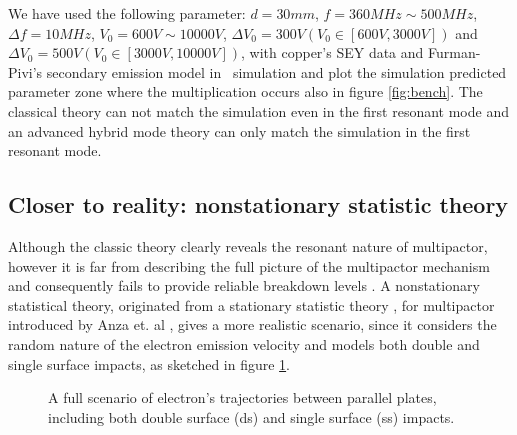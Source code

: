 \documentclass[a4paper,11pt]{article}
\begin{document}
We have used the following parameter: $d=30mm$, $f=360MHz \sim 500MHz$, $\Delta f=10MHz$, $V_0=600V \sim 10000V$, $\Delta V_0=300V (V_0 \in [600V,3000V])$ and $\Delta V_0=500V (V_0 \in [3000V,10000V])$, with copper's SEY data and Furman-Pivi's secondary emission model in \opal\ simulation and plot the simulation predicted parameter zone where the multiplication occurs also in figure \ref{fig:bench}. The classical theory can not match the simulation even in the first resonant mode and an advanced hybrid mode theory \cite{PP} can only match the simulation in the first resonant mode.
\subsection{Closer to reality: nonstationary statistic theory} 
Although the classic theory clearly reveals the resonant nature of multipactor, however it is far from describing the full picture of the multipactor mechanism and consequently fails to provide reliable breakdown levels \cite{NS}. A nonstationary statistical theory, originated from a stationary statistic theory \cite{ST}, for multipactor introduced by Anza et. al \cite{NS}, gives a more realistic scenario, since it considers the random nature of the electron emission velocity and models both double and single surface impacts, as sketched in figure \ref{fig:ss-ds}.
\begin{figure}[H]
\begin{center}

\end{center}
\caption{ A full scenario of electron's trajectories between parallel plates, including both double surface (ds) and single surface (ss) impacts. \cite{NS}\label{fig:ss-ds}}
\end{figure}
\end{document}
